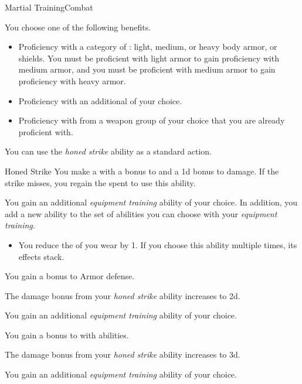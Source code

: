     \begin{feat}{Martial Training}{Combat}

         You choose one of the following benefits.
        \begin{itemize}
            \item Proficiency with a category of : light, medium, or heavy body armor, or shields.
                You must be proficient with light armor to gain proficiency with medium armor, and you must be proficient with medium armor to gain proficiency with heavy armor.
            \item Proficiency with an additional  of your choice.
            \item Proficiency with  from a weapon group of your choice that you are already proficient with.
        \end{itemize}

         You can use the \textit{honed strike} ability as a standard action.
        \begin{apability}{Honed Strike}
            You make a  with a  bonus to  and a \plus1d bonus to damage.
            If the strike misses, you regain the  spent to use this ability.
        \end{apability}

         You gain an additional \textit{equipment training} ability of your choice.
        In addition, you add a new ability to the set of abilities you can choose with your \textit{equipment training}.
        \begin{itemize}
            \item You reduce the  of  you wear by 1.
                If you choose this ability multiple times, its effects stack.
        \end{itemize}

         You gain a  bonus to Armor defense.

         The damage bonus from your \textit{honed strike} ability increases to \plus2d.

         You gain an additional \textit{equipment training} ability of your choice.

         You gain a  bonus to  with  abilities.

         The damage bonus from your \textit{honed strike} ability increases to \plus3d.

         You gain an additional \textit{equipment training} ability of your choice.
    \end{feat}

